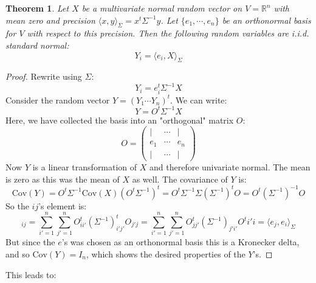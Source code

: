 \documentclass[12pt, a4paper]{article}
\newtheorem{theorem}{Theorem}[section]
\numberwithin{equation}{section}
\begin{document}
\begin{theorem}
\label{decomp_lemma_1}
Let $X$ be a multivariate normal random vector on $V=\mathbb{R}^n$ with mean zero and precision $\langle x,y\rangle_\Sigma=x^t\Sigma^{-1}y$. Let $\{e_1,\cdots,e_n\}$ be an orthonormal basis for $V$ with respect to this precision. Then the following random variables are i.i.d. standard normal:
\begin{equation}
Y_i=\langle e_i,X\rangle_\Sigma
\end{equation}
\end{theorem}
\begin{proof}
Rewrite using $\Sigma$:
\begin{equation}
Y_i=e_i^t\Sigma^{-1}X
\end{equation}
Consider the random vector $Y=(Y_1\cdots Y_n)^t$. We can write:
\begin{equation}
Y=O^t\Sigma^{-1}X
\end{equation}
Here, we have collected the basis into an "orthogonal" matrix $O$:
\begin{equation}
O=
\begin{pmatrix}
| & \cdots & | \\
e_1 & \cdots & e_n \\
| & \cdots & |
\end{pmatrix}
\end{equation}
Now $Y$ is a linear transformation of $X$ and therefore univariate normal. The mean is zero as this was the mean of $X$ as well. The covariance of $Y$ is:
\begin{equation}
\textrm{Cov}(Y)=O^t\Sigma^{-1}\textrm{Cov}(X)(O^t\Sigma^{-1})^t=O^t\Sigma^{-1}\Sigma(\Sigma^{-1})^t O=O^t(\Sigma^{-1})^{-1}O
\end{equation}
So the $ij$'s element is:
\begin{equation}
[\textrm{Cov}(Y)]_{ij}=\sum_{i'=1}^n\sum_{j'=1}^n O^t_{ii'}(\Sigma^{-1})^t_{i'j'}O_{j'j}=\sum_{i'=1}^n\sum_{j'=1}^n O^t_{jj'}(\Sigma^{-1})_{j'i'}O^t{i'i}=\langle e_j,e_i\rangle_\Sigma
\end{equation}
But since the $e$'s was chosen as an orthonormal basis this is a Kronecker delta, and so $\textrm{Cov}(Y)=I_n$, which shows the desired properties of the $Y$'s.
\end{proof}

This leads to:
\end{document}
